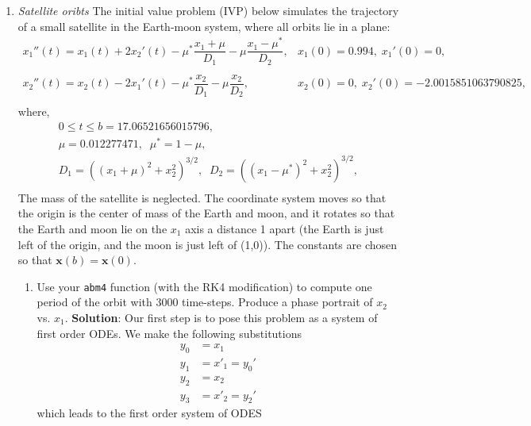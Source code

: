 \documentclass[final,oneside,onecolumn]{article}
\newcommand{\vx}{\mathbf{x}}
\begin{document}
\begin{enumerate}
\bigbreak
\item \emph{Satellite oribts} The initial value problem (IVP) below simulates the trajectory of a 
small satellite in the Earth-moon system, where all orbits lie in a plane:
\begin{equation*}
\begin{array}{rll}
x_1''(t) = x_1(t) + 2x_2'(t) - \mu^{*}\dfrac{x_1 + \mu}{D_1} - \mu\dfrac{x_1 - \mu^{*}}{D_2}, & x_1(0) = 0.994,\;x_1'(0) = 0,\\
\\
x_2''(t) = x_2(t) - 2x_1'(t) - \mu^{*}\dfrac{x_2}{D_1} - \mu\dfrac{x_2}{D_2}, & x_2(0) = 0,\;x_2'(0) = -2.0015851063790825,\\
\end{array}
\end{equation*}
where,
\begin{equation*}
\begin{array}{c}
0 \leq t \leq b=17.06521656015796, \\
\mu = 0.012277471,\;\; \mu^{*} = 1-\mu, \\
D_1 = ((x_1 + \mu)^2 + x_2^2)^{3/2}, \;\; D_2 = ((x_1 - \mu^{*})^2 + x_2^2)^{3/2}, \\
\end{array}
\end{equation*}
The mass of the satellite is neglected.  The coordinate system moves so that the
origin is the center of mass of the Earth and moon, and it rotates so that the
Earth and moon lie on the $x_1$ axis a distance 1 apart (the Earth is just left of
the origin, and the moon is just left of (1,0)). The constants are chosen so that
$\vx(b) = \vx(0)$.
\begin{enumerate}
   \item Use your \verb|abm4| function (with the RK4 modification) to compute one
   period of the orbit with 3000 time-steps.  Produce a phase portrait of $x_2$ vs.
   $x_1$. 
\bigbreak
{\large \bf Solution}: Our first step is to pose this problem as a system of first order ODEs. We make the following substitutions
\begin{align*}
	y_0 &= x_1 \\
	y_1 &= x'_1 = y_0' \\
	y_2 &= x_2 \\
	y_3 &= x'_2 = y_2'
\end{align*}
which leads to the first order system of ODES
\begin{equation*}

\end{equation*}
\end{enumerate}
\end{enumerate}
\end{document}
